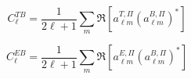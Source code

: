 

\[
C_\ell^{TB}
= \frac{1}{2\ell+1}
\sum_m
\Re\!\left[
a_{\ell m}^{T,\Pi}
\left(a_{\ell m}^{B,\Pi}\right)^*
\right]
\]




\[
C_\ell^{EB}
= \frac{1}{2\ell+1}
\sum_m
\Re\!\left[
a_{\ell m}^{E,\Pi}
\left(a_{\ell m}^{B,\Pi}\right)^*
\right]
\]



